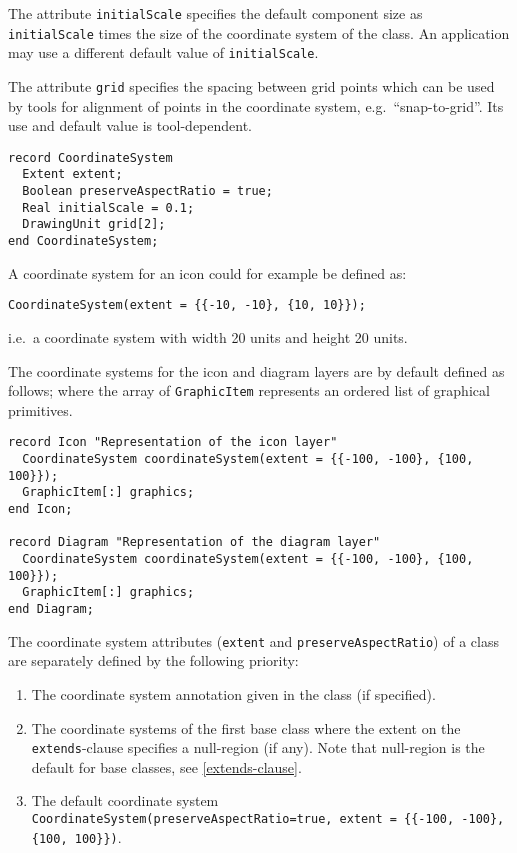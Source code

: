 The attribute \lstinline!initialScale! specifies the default component size as
\lstinline!initialScale! times the size of the coordinate system of the class. An
application may use a different default value of \lstinline!initialScale!.

The attribute \lstinline!grid! specifies the spacing between grid points which can
be used by tools for alignment of points in the coordinate system, e.g.\ ``snap-to-grid''.
Its use and default value is tool-dependent.

\begin{lstlisting}[language=modelica]
record CoordinateSystem
  Extent extent;
  Boolean preserveAspectRatio = true;
  Real initialScale = 0.1;
  DrawingUnit grid[2];
end CoordinateSystem;
\end{lstlisting}

\begin{example}
A coordinate system for an icon could for example be defined as:
\begin{lstlisting}[language=modelica]
CoordinateSystem(extent = {{-10, -10}, {10, 10}});
\end{lstlisting}
i.e.\ a coordinate system with width 20 units and height 20 units.
\end{example}

The coordinate systems for the icon and diagram layers are by default defined as follows; where the array of \lstinline!GraphicItem! represents an ordered list of graphical primitives.

\begin{lstlisting}[language=modelica]
record Icon "Representation of the icon layer"
  CoordinateSystem coordinateSystem(extent = {{-100, -100}, {100, 100}});
  GraphicItem[:] graphics;
end Icon;

record Diagram "Representation of the diagram layer"
  CoordinateSystem coordinateSystem(extent = {{-100, -100}, {100, 100}});
  GraphicItem[:] graphics;
end Diagram;
\end{lstlisting}
The coordinate system attributes (\lstinline!extent! and \lstinline!preserveAspectRatio!) of a class are separately defined by the following priority:
\begin{enumerate}
\item
  The coordinate system annotation given in the class (if specified).
\item
  The coordinate systems of the first base class where the extent on the \lstinline!extends!-clause specifies a null-region (if any).
  Note that null-region is the default for base classes, see \cref{extends-clause}.
\item
  The default coordinate system \lstinline!CoordinateSystem(preserveAspectRatio=true, extent = {{-100, -100}, {100, 100}})!.
\end{enumerate}

